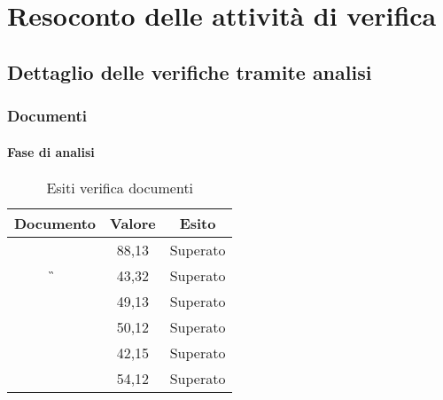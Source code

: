\newpage
\section{Resoconto delle attività di verifica}

	\subsection{Dettaglio delle verifiche tramite analisi}
	
	\subsubsection{Documenti}
	
	\paragraph{Fase di analisi}
	
		\begin{table}[H]
			\begin{center}
				\begin{tabular}{|c|c|c|}
					\hline
					\textbf{Documento}&	{\textbf{Valore}} & \textbf{Esito} \\
					\hline
					\AdR		&	88,13	&	Superato	\\
					\hline
					\G			&	43,32	&	Superato	\\
					\hline
					\NdP		&	49,13	&	Superato	\\
					\hline
					\PdP 		&	50,12	&	Superato 	\\
					\hline
					\PdQ 		&	42,15	&	Superato	\\
					\hline
					\SdF		& 	54,12	&	Superato	\\
					\hline
				\end{tabular}
			\end{center}
			\caption{Esiti verifica documenti}
		\end{table}